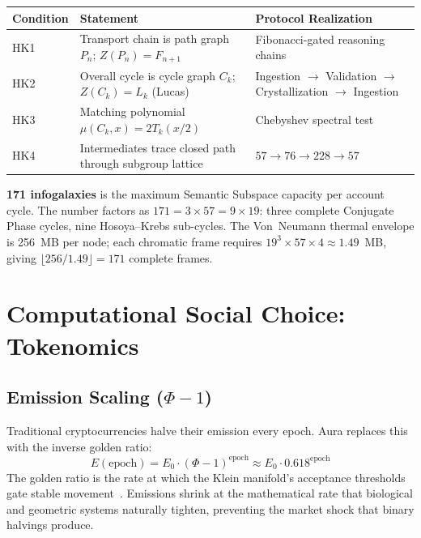 \documentclass[12pt,a4paper]{article}
\begin{document}
\begin{center}
\small
\begin{tabular}{@{}lp{5cm}p{5cm}@{}}
\toprule
\textbf{Condition} & \textbf{Statement} & \textbf{Protocol Realization} \\
\midrule
HK1 & Transport chain is path graph $P_n$; $Z(P_n) = F_{n+1}$ & Fibonacci-gated reasoning chains \\
HK2 & Overall cycle is cycle graph $C_k$; $Z(C_k) = L_k$ (Lucas) & Ingestion $\to$ Validation $\to$ Crystallization $\to$ Ingestion \\
HK3 & Matching polynomial $\mu(C_k, x) = 2T_k(x/2)$ & Chebyshev spectral test~\cite{kohmoto1983} \\
HK4 & Intermediates trace closed path through subgroup lattice & $57 \to 76 \to 228 \to 57$~\cite{PP-II-Ch21} \\
\bottomrule
\end{tabular}
\end{center}

\textbf{171 infogalaxies} is the maximum Semantic Subspace capacity per account cycle. The number factors as $171 = 3 \times 57 = 9 \times 19$: three complete Conjugate Phase cycles, nine Hosoya--Krebs sub-cycles. The Von~Neumann thermal envelope is 256~MB per node; each chromatic frame requires $19^3 \times 57 \times 4 \approx 1.49$~MB, giving $\lfloor 256/1.49 \rfloor = 171$ complete frames.

\section{Computational Social Choice: Tokenomics}
\label{sec:tokenomics}

\subsection{Emission Scaling ($\Phi - 1$)}

Traditional cryptocurrencies halve their emission every epoch. Aura replaces this with the inverse golden ratio:
\begin{equation}
E(\mathrm{epoch}) = E_0 \cdot (\Phi - 1)^{\mathrm{epoch}} \approx E_0 \cdot 0.618^{\mathrm{epoch}}
\end{equation}
The golden ratio is the rate at which the Klein manifold's acceptance thresholds gate stable movement~\cite{PP-I-Ch11}. Emissions shrink at the mathematical rate that biological and geometric systems naturally tighten, preventing the market shock that binary halvings produce.
\end{document}
